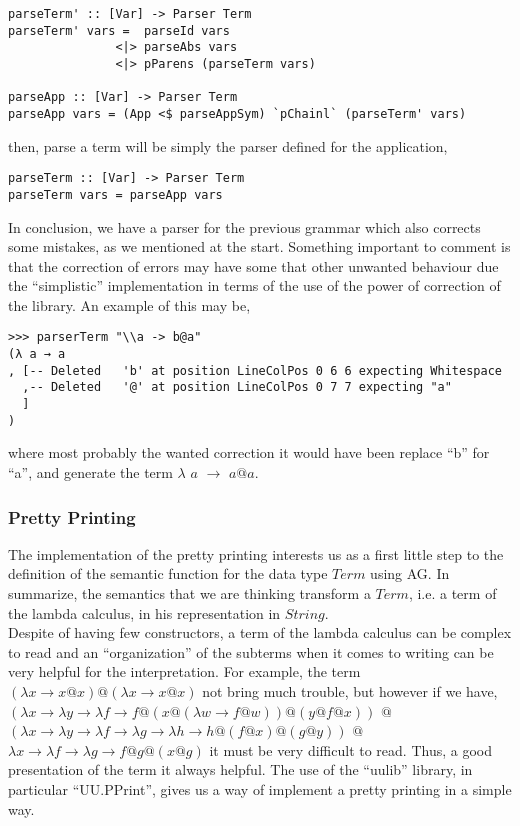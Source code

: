 \documentclass[a4paper,10pt]{article}
\begin{document}
\begin{lstlisting}
parseTerm' :: [Var] -> Parser Term
parseTerm' vars =  parseId vars
               <|> parseAbs vars
               <|> pParens (parseTerm vars)

parseApp :: [Var] -> Parser Term
parseApp vars = (App <$ parseAppSym) `pChainl` (parseTerm' vars)
\end{lstlisting}

then, parse a term will be simply the parser defined for the application,

\begin{lstlisting}
parseTerm :: [Var] -> Parser Term
parseTerm vars = parseApp vars
\end{lstlisting}

In conclusion, we have a parser for the previous grammar which also corrects some
mistakes, as we mentioned at the start. Something important to comment is that the
correction of errors may have some that other unwanted behaviour due the ``simplistic''
implementation in terms of the use of the power of correction of the library. An
example of this may be,

\begin{verbatim}
>>> parserTerm "\\a -> b@a"
(λ a → a
, [-- Deleted   'b' at position LineColPos 0 6 6 expecting Whitespace
  ,-- Deleted   '@' at position LineColPos 0 7 7 expecting "a"
  ]
)
\end{verbatim}

where most probably the wanted correction it would have been replace ``b'' for
``a'', and generate the term $\lambda$ $a$ $\rightarrow$ $a@a$.

\subsubsection{Pretty Printing}

The implementation of the pretty printing interests us as a first little step to
the definition of the semantic function for the data type $Term$ using AG. In
summarize, the semantics that we are thinking transform a $Term$, i.e. a term
of the lambda calculus, in his representation in $String$.\\

Despite of having few constructors, a term of the lambda calculus can be complex
to read and an ``organization'' of the subterms when it comes to writing can be
very helpful for the interpretation. For example, the term 
$(\lambda x \rightarrow x@x)@(\lambda x \rightarrow x@x)$
not bring much trouble, but however if we have,
$(\lambda x \rightarrow
	\lambda y \rightarrow
		\lambda f \rightarrow f @ (x @ (\lambda w \rightarrow f @ w)) @ (y @ f @ x))$
$@$
$(\lambda x \rightarrow 
	\lambda y \rightarrow \lambda f \rightarrow 
	\lambda g \rightarrow \lambda h \rightarrow h @ (f @ x) @ (g @ y))$
$@$ $\lambda x \rightarrow \lambda f \rightarrow 
		\lambda g \rightarrow f @ g @ (x @ g)$
it must be very difficult to read. Thus, a good presentation of the term it always
helpful. The use of the ``uulib'' library, in particular ``UU.PPrint'', gives us
a way of implement a pretty printing in a simple way.\\
\end{document}
